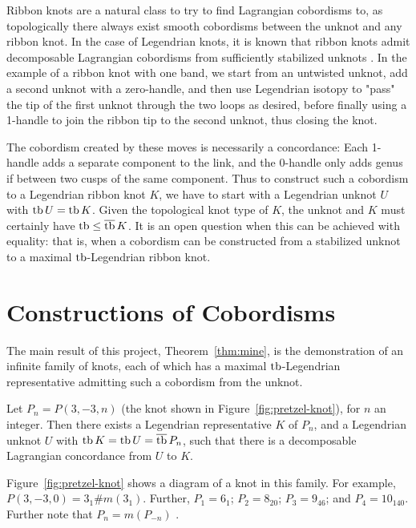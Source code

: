 Ribbon knots are a natural class to try to find Lagrangian cobordisms to, as topologically there always exist smooth cobordisms between the unknot and any ribbon knot.
In the case of Legendrian knots, it is known that ribbon knots admit decomposable Lagrangian cobordisms from sufficiently stabilized unknots \cite{leverson-etnyre}.
In the example of a ribbon knot with one band, we start from an untwisted unknot, add a second unknot with a zero-handle, and then use Legendrian isotopy to "pass" the tip of the first unknot through the two loops as desired, before finally using a 1-handle to join the ribbon tip to the second unknot, thus closing the knot. 

The cobordism created by these moves is necessarily a concordance: Each 1-handle adds a separate component to the link, and the 0-handle only adds genus if between two cusps of the same component.
Thus to construct such a cobordism to a Legendrian ribbon knot $K$, we have to start with a Legendrian unknot $U$ with $\operatorname{tb} U = \operatorname{tb} K$. Given the topological knot type of $K$, the unknot and $K$ must certainly have $\operatorname{tb} \leq \overline{\operatorname{tb}}\, K$.
It is an open question when this can be achieved with equality: that is, when a cobordism can be constructed from a stabilized unknot to a maximal $\operatorname{tb}$-Legendrian ribbon knot.


\section{Constructions of Cobordisms}\label{sec:thm-a-proof}
The main result of this project, Theorem~\ref{thm:mine}, is the demonstration of an infinite family of knots, each of which has a maximal $\operatorname{tb}$-Legendrian representative admitting such a cobordism from the unknot.

\begin{mythm}\label{thm:mine}
    Let $P_n = P(3, -3, n)$ (the knot shown in Figure~\ref{fig:pretzel-knot}), for $n$ an integer. Then there exists a Legendrian representative $K$ of $P_n$, and a Legendrian unknot $U$ with ${\operatorname{tb} K = \operatorname{tb} U = \overline{\operatorname{tb}}\, P_n}$, such that there is a decomposable Lagrangian concordance from $U$ to $K$.
\end{mythm}

Figure~\ref{fig:pretzel-knot} shows a diagram of a knot in this family.
For example, $P(3, -3, 0) = 3_1 \# m(3_1)$. Further, $P_1 = 6_1$; $P_2 = 8_{20}$; $P_3 = 9_{46}$; and $P_4 = 10_{140}$. Further note that $P_n = m(P_{-n})$ \cite{kawauchi}.

